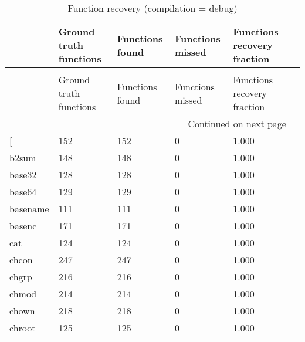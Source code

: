 \begin{longtable}{lp{2.40cm}p{2.40cm}p{2.40cm}p{2.40cm}p{2.40cm}}
\caption{Function recovery (compilation = debug)}
\label{table:functions-O0-debug}\\
\toprule
{} &  Ground truth functions &  Functions found &  Functions missed &  Functions recovery fraction \\
\midrule
\endfirsthead
\caption[]{Function recovery (compilation = debug)} \\
\toprule
{} &  Ground truth functions &  Functions found &  Functions missed &  Functions recovery fraction \\
\midrule
\endhead
\midrule
\multicolumn{5}{r}{{Continued on next page}} \\
\midrule
\endfoot

\bottomrule
\endlastfoot
{[}         &                     152 &              152 &                 0 &                        1.000 \\
b2sum     &                     148 &              148 &                 0 &                        1.000 \\
base32    &                     128 &              128 &                 0 &                        1.000 \\
base64    &                     129 &              129 &                 0 &                        1.000 \\
basename  &                     111 &              111 &                 0 &                        1.000 \\
basenc    &                     171 &              171 &                 0 &                        1.000 \\
cat       &                     124 &              124 &                 0 &                        1.000 \\
chcon     &                     247 &              247 &                 0 &                        1.000 \\
chgrp     &                     216 &              216 &                 0 &                        1.000 \\
chmod     &                     214 &              214 &                 0 &                        1.000 \\
chown     &                     218 &              218 &                 0 &                        1.000 \\
chroot    &                     125 &              125 &                 0 &                        1.000 \\

\end{longtable}
